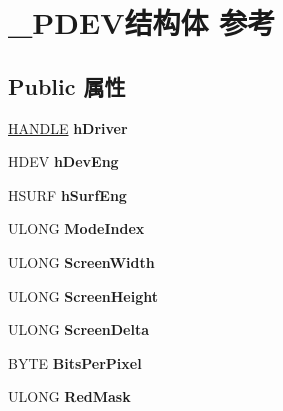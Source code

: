 \hypertarget{struct___p_d_e_v}{}\section{\+\_\+\+P\+D\+E\+V结构体 参考}
\label{struct___p_d_e_v}
\subsection*{Public 属性}
\begin{DoxyCompactItemize}
\item 
\mbox{\label{struct___p_d_e_v_a86e649b6bf5be541809718387d717b2f}} 
\hyperlink{interfacevoid}{H\+A\+N\+D\+LE} {\bfseries h\+Driver}
\item 
\mbox{\label{struct___p_d_e_v_a0bddc3ff3bb4e290dece75d2760c0a1c}} 
H\+D\+EV {\bfseries h\+Dev\+Eng}
\item 
\mbox{\label{struct___p_d_e_v_adb2feb356bd093ff6e2bf20f2aa45b39}} 
H\+S\+U\+RF {\bfseries h\+Surf\+Eng}
\item 
\mbox{\label{struct___p_d_e_v_a04645a800ffe87b1c34d8c3191d13b63}} 
U\+L\+O\+NG {\bfseries Mode\+Index}
\item 
\mbox{\label{struct___p_d_e_v_a225a9972719a3b7d11aefc110c7a40b6}} 
U\+L\+O\+NG {\bfseries Screen\+Width}
\item 
\mbox{\label{struct___p_d_e_v_a5cd157a90647de37d6da795a54b4f4f9}} 
U\+L\+O\+NG {\bfseries Screen\+Height}
\item 
\mbox{\label{struct___p_d_e_v_a177c3971f11be3101eb7c6ee291335b1}} 
U\+L\+O\+NG {\bfseries Screen\+Delta}
\item 
\mbox{\label{struct___p_d_e_v_aa9a72230e6817e75eaf8ba229fbc7eb8}} 
B\+Y\+TE {\bfseries Bits\+Per\+Pixel}
\item 
\mbox{\label{struct___p_d_e_v_a8560738ca6caa14e9acdca06ce5494ed}} 
U\+L\+O\+NG {\bfseries Red\+Mask}
\item 
\mbox{\label{struct___p_d_e_v_a295a754263a3491b4a2ded0cd7f661f0}} 

\end{DoxyCompactItemize}
